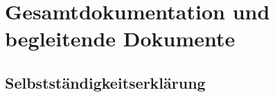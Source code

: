 \chapter[Gesamtdokumentation]{Gesamtdokumentation und begleitende Dokumente}

\section{Selbstständigkeitserklärung}

